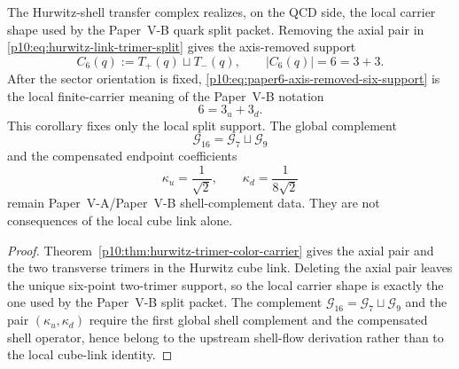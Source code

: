 \documentclass[12pt,a4paper]{article}
\begin{document}
\begin{corollary}
\label{p10:cor:paper6-split-carrier-realization}
The Hurwitz-shell transfer complex realizes, on the QCD side, the local carrier
shape used by the Paper~V-B quark split packet.  Removing the axial pair in
\eqref{p10:eq:hurwitz-link-trimer-split} gives the axis-removed support
\begin{equation}
\label{p10:eq:paper6-axis-removed-six-support}
C_6(q):=T_+(q)\sqcup T_-(q),
\qquad
|C_6(q)|=6=3+3.
\end{equation}
After the sector orientation is fixed, \eqref{p10:eq:paper6-axis-removed-six-support}
is the local finite-carrier meaning of the Paper~V-B notation
\begin{equation}
\label{p10:eq:paper6-six-as-two-trimers}
6=3_u+3_d.
\end{equation}
This corollary fixes only the local split support.  The global complement
\begin{equation}
\label{p10:eq:paper6-global-complement-not-local-link}
\mathcal G_{16}=\mathcal G_7\sqcup\mathcal G_9
\end{equation}
and the compensated endpoint coefficients
\begin{equation}
\label{p10:eq:paper6-endpoint-coefficients-not-local-link}
\kappa_u=\frac1{\sqrt2},
\qquad
\kappa_d=\frac1{8\sqrt2}
\end{equation}
remain Paper~V-A/Paper~V-B shell-complement data.  They are not consequences of the
local cube link alone.
\end{corollary}
\begin{proof}
Theorem~\ref{p10:thm:hurwitz-trimer-color-carrier} gives the axial pair and the
two transverse trimers in the Hurwitz cube link.  Deleting the axial pair leaves
the unique six-point two-trimer support, so the local carrier shape is exactly
the one used by the Paper~V-B split packet.  The complement
\(\mathcal G_{16}=\mathcal G_7\sqcup\mathcal G_9\) and the pair
\((\kappa_u,\kappa_d)\) require the first global shell complement and the
compensated shell operator, hence belong to the upstream shell-flow derivation
rather than to the local cube-link identity.
\end{proof}
\end{document}
